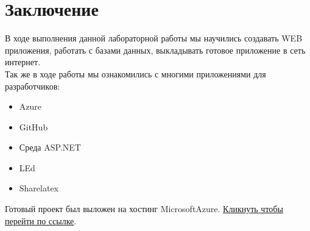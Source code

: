 \documentclass{article}
\begin{document}
\newpage
 \section{Заключение}
 В ходе выполнения данной лабораторной работы мы научились создавать WEB приложения, работать с базами данных, выкладывать готовое приложение в сеть интернет.\\
 Так же в ходе работы мы ознакомились с многими приложениями для разработчиков:
 \begin{itemize}
\item Azure
\item GitHub
\item Среда ASP.NET
\item LEd
\item Sharelatex
\end{itemize}
Готовый проект был выложен на хостинг MicrosoftAzure.
\href{http://mintminds.azurewebsites.net}{Кликнуть чтобы перейти по ссылке}.
\end{document}
